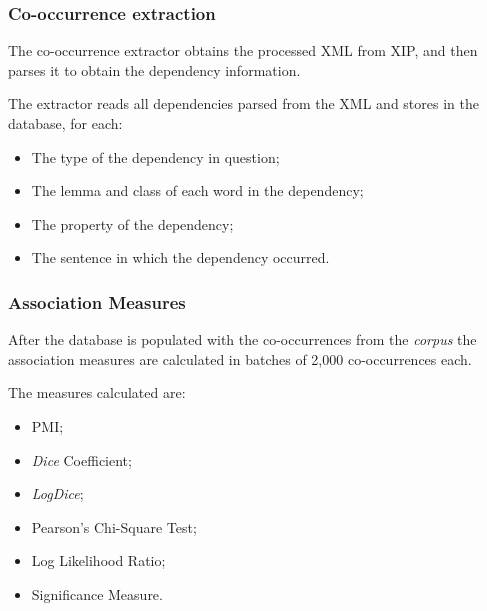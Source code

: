 \subsubsection*{Co-occurrence extraction}

The co-occurrence extractor obtains the processed XML from XIP, and then parses
it to obtain the dependency information.

The extractor reads all dependencies parsed from the XML and stores in the
database, for each:

\begin{itemize}
  \item The type of the dependency in question;
  \item The lemma and class of each word in the dependency;
  \item The property of the dependency;
  \item The sentence in which the dependency occurred.
\end{itemize}

\subsubsection*{Association Measures}
\label{sec:assoc}

After the database is populated with the co-occurrences from the \textit{corpus}
the association measures are calculated in batches of 2,000 co-occurrences
each.

The measures calculated are:

\begin{itemize}
  \item \ac{PMI};
  \item \textit{Dice} Coefficient;
  \item \textit{LogDice};
  \item Pearson's Chi-Square Test;
  \item Log Likelihood Ratio;
  \item Significance Measure.
\end{itemize}


